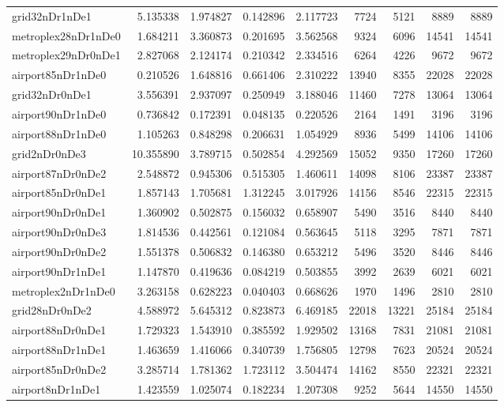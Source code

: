 \begin{longtable}{|l|r|r|r|r|r|r|r|r|}
grid32nDr1nDe1 & 5.135338 & 1.974827 & 0.142896 & 2.117723 & 7724 & 5121 & 8889 & 8889 \\
metroplex28nDr1nDe0 & 1.684211 & 3.360873 & 0.201695 & 3.562568 & 9324 & 6096 & 14541 & 14541 \\
metroplex29nDr0nDe1 & 2.827068 & 2.124174 & 0.210342 & 2.334516 & 6264 & 4226 & 9672 & 9672 \\
airport85nDr1nDe0 & 0.210526 & 1.648816 & 0.661406 & 2.310222 & 13940 & 8355 & 22028 & 22028 \\
grid32nDr0nDe1 & 3.556391 & 2.937097 & 0.250949 & 3.188046 & 11460 & 7278 & 13064 & 13064 \\
airport90nDr1nDe0 & 0.736842 & 0.172391 & 0.048135 & 0.220526 & 2164 & 1491 & 3196 & 3196 \\
airport88nDr1nDe0 & 1.105263 & 0.848298 & 0.206631 & 1.054929 & 8936 & 5499 & 14106 & 14106 \\
grid2nDr0nDe3 & 10.355890 & 3.789715 & 0.502854 & 4.292569 & 15052 & 9350 & 17260 & 17260 \\
airport87nDr0nDe2 & 2.548872 & 0.945306 & 0.515305 & 1.460611 & 14098 & 8106 & 23387 & 23387 \\
airport85nDr0nDe1 & 1.857143 & 1.705681 & 1.312245 & 3.017926 & 14156 & 8546 & 22315 & 22315 \\
airport90nDr0nDe1 & 1.360902 & 0.502875 & 0.156032 & 0.658907 & 5490 & 3516 & 8440 & 8440 \\
airport90nDr0nDe3 & 1.814536 & 0.442561 & 0.121084 & 0.563645 & 5118 & 3295 & 7871 & 7871 \\
airport90nDr0nDe2 & 1.551378 & 0.506832 & 0.146380 & 0.653212 & 5496 & 3520 & 8446 & 8446 \\
airport90nDr1nDe1 & 1.147870 & 0.419636 & 0.084219 & 0.503855 & 3992 & 2639 & 6021 & 6021 \\
metroplex2nDr1nDe0 & 3.263158 & 0.628223 & 0.040403 & 0.668626 & 1970 & 1496 & 2810 & 2810 \\
grid28nDr0nDe2 & 4.588972 & 5.645312 & 0.823873 & 6.469185 & 22018 & 13221 & 25184 & 25184 \\
airport88nDr0nDe1 & 1.729323 & 1.543910 & 0.385592 & 1.929502 & 13168 & 7831 & 21081 & 21081 \\
airport88nDr1nDe1 & 1.463659 & 1.416066 & 0.340739 & 1.756805 & 12798 & 7623 & 20524 & 20524 \\
airport85nDr0nDe2 & 3.285714 & 1.781362 & 1.723112 & 3.504474 & 14162 & 8550 & 22321 & 22321 \\
airport8nDr1nDe1 & 1.423559 & 1.025074 & 0.182234 & 1.207308 & 9252 & 5644 & 14550 & 14550 \\

\end{longtable}
